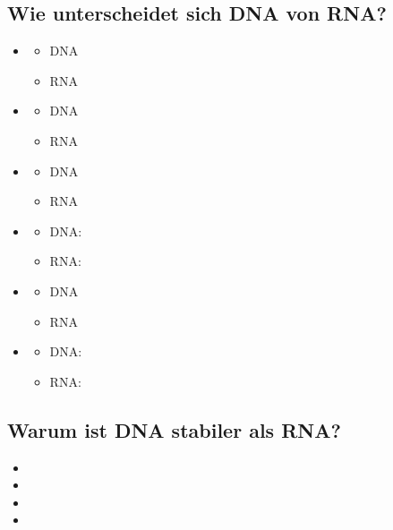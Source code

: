 \documentclass{article}
\begin{document}
\subsection*{Wie unterscheidet sich DNA von RNA?}
\begin{itemize}
    \item 
    \begin{itemize}
        \item DNA  
        \item RNA  
    \end{itemize}
    \item 
    \begin{itemize}
        \item DNA  
        \item RNA  
    \end{itemize}
    \item 
    \begin{itemize}
        \item DNA  
        \item RNA 
    \end{itemize}
    \item 
    \begin{itemize}
        \item DNA: 
        \item RNA: 
    \end{itemize}
    \item 
    \begin{itemize}
        \item DNA 
        \item RNA 
    \end{itemize}
    \item 
    \begin{itemize}
        \item DNA: 
        \item RNA: 
    \end{itemize}
\end{itemize}

\subsection*{Warum ist DNA stabiler als RNA?}
\bigskip\bigskip\bigskip\bigskip

\begin{itemize}
    \item 
    \item 
    \item 
    \item 
\end{itemize}
\end{document}
